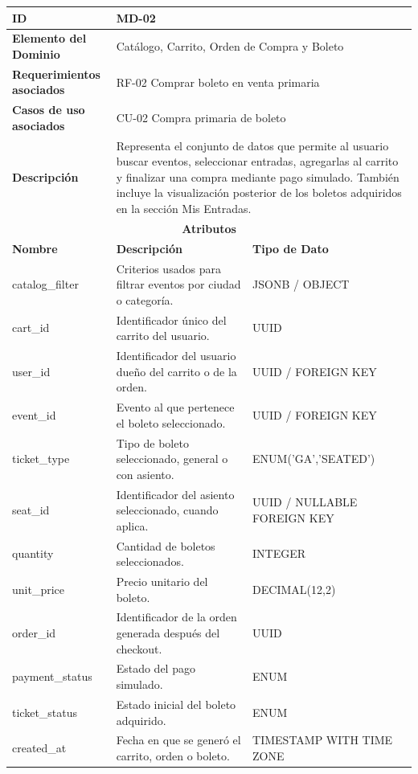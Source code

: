 \documentclass[12pt,letterpaper]{article}
\begin{document}
\begin{table}[H]
\centering
\scriptsize
\renewcommand{\arraystretch}{1.12}
\setlength{\tabcolsep}{4pt}

\begin{tabularx}{\textwidth}{|p{3.2cm}|X|p{3.8cm}|}
\hline
\textbf{ID} & MD-02 & \\ \hline

\textbf{Elemento del Dominio} & 
\multicolumn{2}{X|}{Catálogo, Carrito, Orden de Compra y Boleto} \\ \hline

\textbf{Requerimientos asociados} & 
\multicolumn{2}{X|}{RF-02 Comprar boleto en venta primaria} \\ \hline

\textbf{Casos de uso asociados} & 
\multicolumn{2}{X|}{CU-02 Compra primaria de boleto} \\ \hline

\textbf{Descripción} & 
\multicolumn{2}{X|}{Representa el conjunto de datos que permite al usuario buscar eventos, seleccionar entradas, agregarlas al carrito y finalizar una compra mediante pago simulado. También incluye la visualización posterior de los boletos adquiridos en la sección Mis Entradas.} \\ \hline

\multicolumn{3}{|c|}{\textbf{Atributos}} \\ \hline

\textbf{Nombre} & \textbf{Descripción} & \textbf{Tipo de Dato} \\ \hline

catalog\_filter & Criterios usados para filtrar eventos por ciudad o categoría. & JSONB / OBJECT \\ \hline
cart\_id & Identificador único del carrito del usuario. & UUID \\ \hline
user\_id & Identificador del usuario dueño del carrito o de la orden. & UUID / FOREIGN KEY \\ \hline
event\_id & Evento al que pertenece el boleto seleccionado. & UUID / FOREIGN KEY \\ \hline
ticket\_type & Tipo de boleto seleccionado, general o con asiento. & ENUM('GA','SEATED') \\ \hline
seat\_id & Identificador del asiento seleccionado, cuando aplica. & UUID / NULLABLE FOREIGN KEY \\ \hline
quantity & Cantidad de boletos seleccionados. & INTEGER \\ \hline
unit\_price & Precio unitario del boleto. & DECIMAL(12,2) \\ \hline
order\_id & Identificador de la orden generada después del checkout. & UUID \\ \hline
payment\_status & Estado del pago simulado. & ENUM\\ \hline
ticket\_status & Estado inicial del boleto adquirido. & ENUM \\ \hline
created\_at & Fecha en que se generó el carrito, orden o boleto. & TIMESTAMP WITH TIME ZONE \\ \hline


\end{tabularx}
\end{table}
\end{document}
